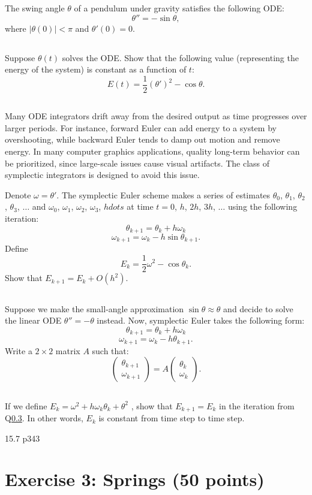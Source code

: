 The swing angle $\theta$ of a pendulum under gravity satisfies the following ODE:
$$\theta'' = -\sin \theta,$$
where $|\theta(0)| < \pi$ and $\theta'(0) = 0$.

\subsection{} Suppose $\theta(t)$ solves the ODE. Show that the following value (representing the energy of the system) is constant as a function of $t$:
$$E(t) = \frac{1}{2}(\theta')^2 - \cos \theta.$$

\subsection{} Many ODE integrators drift away from the desired output as time progresses over larger periods. For instance, forward Euler can add energy to a system by overshooting, while backward Euler tends to damp out motion and remove energy. In many computer graphics applications, quality long-term behavior can be prioritized, since large-scale issues cause visual artifacts. The class of symplectic integrators is designed to avoid this issue.

Denote $\omega = \theta'$. The symplectic Euler scheme makes a series of estimates $\theta_ 0$, $\theta_ 1$, $\theta_ 2$, $\theta_ 3$, $\hdots$ and $\omega_0$, $\omega_1$, $\omega_2$, $\omega_3$, $hdots$ at time $t = 0$, $h$, $2h$, $3h$, $\hdots$ using the following iteration:
$$\theta_{k+1} = \theta_k + h\omega_k$$
$$\omega_{k+1} = \omega_k - h \sin \theta_{k+1}.$$
Define
$$E_k = \frac{1}{2}\omega^2 - \cos \theta_k.$$
Show that $E_{k+1} = E_k + O(h^2)$.

\subsection{} \label{q} Suppose we make the small-angle approximation $\sin \theta \approx \theta$ and decide to solve the linear ODE $\theta'' = -\theta$ instead. Now, symplectic Euler takes the following form:
$$\theta_{k+1} = \theta_k + h\omega_k$$
$$\omega_{k+1} = \omega_k - h\theta_{k+1}.$$
Write a $2 \times 2$ matrix $A$ such that:
$$
\left(\begin{matrix}
  \theta_{k+1} \\
  \omega_{k+1}
  \end{matrix} \right)
=
A
  \left(\begin{matrix}
     \theta_k \\
  \omega_k
  \end{matrix} \right)
  .$$

\subsection{} If we define $E_k = \omega^2 + h\omega_k\theta_k + \theta^2$ , show that $E_{k+1} = E_k$ in the iteration from Q\ref{q}. In other words, $E_k$ is constant from time step to time step.
  
15.7 p343
 
\section*{Exercise 3: Springs \normalsize \textnormal(50 points)}



